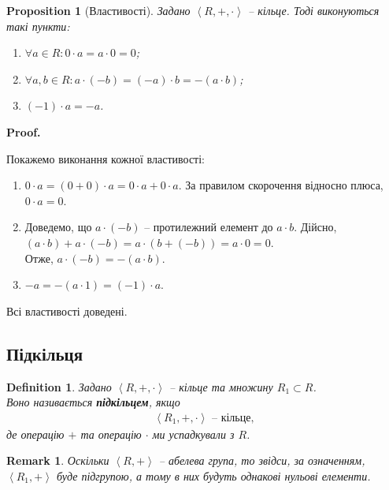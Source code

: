 \documentclass[a4paper, 10pt]{article}
\makeatletter
\theoremstyle{theoremdd}
\theoremstyle{theoremdd}
\newtheorem{definition}[theorem]{Definition}
\theoremstyle{theoremdd}
\theoremstyle{theoremdd}
\theoremstyle{theoremdd}
\theoremstyle{theoremdd}
\theoremstyle{theoremdd}
\theoremstyle{theoremdd}
\theoremstyle{theoremdd}
\newtheorem{proposition}[theorem]{Proposition}
\theoremstyle{theoremdd}
\theoremstyle{theoremdd}
\newtheorem{remark}[theorem]{Remark}
\theoremstyle{theoremdd}
\theoremstyle{theoremdd}
\theoremstyle{theoremdd}
\theoremstyle{theoremdd}
\renewenvironment{proof}[1][Proof.\\]{\par
\pushQED{\hfill \qed}%
\normalfont \topsep6\p@\@plus6\p@\relax
\trivlist
\item\relax
{\bfseries
#1\@addpunct{.}}\hspace\labelsep\ignorespaces
}{%
\popQED\endtrivlist\@endpefalse
}
\makeatother
\begin{document}
\begin{proposition}[Властивості]
Задано $\left<R,+,\cdot \right>$ -- кільце. Тоді виконуються такі пункти:
\begin{enumerate}[nosep, wide=0pt, label={\arabic*)}]
\item $\forall a \in R: 0 \cdot a = a \cdot 0 = 0$;
\item $\forall a,b \in R: a \cdot (-b) = (-a) \cdot b = -(a \cdot b)$;
\item $(-1) \cdot a = -a$.
\end{enumerate}
\end{proposition}

\begin{proof}
Покажемо виконання кожної властивості:
\begin{enumerate}[wide=0pt, label={\arabic*)}]
\item $0 \cdot a = (0 + 0) \cdot a = 0 \cdot a + 0 \cdot a$. За правилом скорочення відносно плюса, $0 \cdot a = 0$.

\item Доведемо, що $a \cdot (-b)$ -- протилежний елемент до $a \cdot b$. Дійсно,\\
$(a \cdot b) + a \cdot (-b) = a \cdot (b + (-b)) = a \cdot 0 = 0$.\\
Отже, $a \cdot (-b) = -(a \cdot b)$.

\item $-a = -(a \cdot 1) = (-1) \cdot a$.
\end{enumerate}
Всі властивості доведені.
\end{proof}

\subsection{Підкільця}
\begin{definition}
Задано $\left<R,+, \cdot \right>$ -- кільце та множину $R_1 \subset R$.\\
Воно називається \textbf{підкільцем}, якщо 
\begin{align*}
\left<R_1,+,\cdot \right> \text{ -- кільце},
\end{align*}
де операцію $+$ та операцію $\cdot$ ми успадкували з $R$.
\end{definition}

\begin{remark}
Оскільки $\left< R,+\right>$ -- абелева група, то звідси, за означенням, $\left< R_1,+\right>$ буде підгрупою, а тому в них будуть однакові нульові елементи.
\end{remark}
\end{document}
